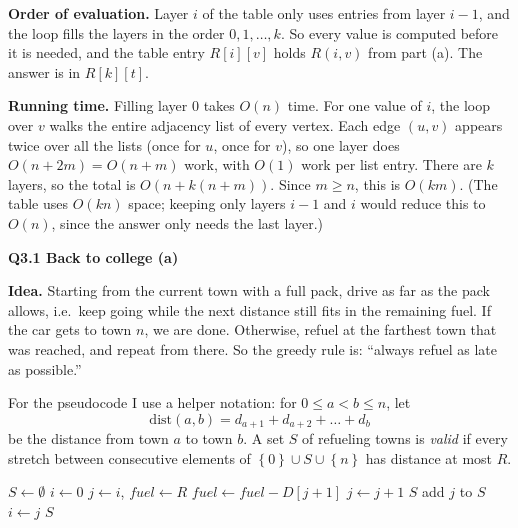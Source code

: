 \documentclass[11pt]{article}
\newcommand{\set}[1]{\left\{#1\right\}}
\newcommand{\qpage}[1]{\clearpage\noindent\textbf{\large #1}\par\medskip}
\begin{document}
\textbf{Order of evaluation.}
Layer $i$ of the table only uses entries from layer $i-1$, and the loop fills the layers in the order $0,1,\dots,k$.
So every value is computed before it is needed, and the table entry $R[i][v]$ holds $R(i,v)$ from part (a).
The answer is in $R[k][t]$.

\textbf{Running time.}
Filling layer $0$ takes $O(n)$ time.
For one value of $i$, the loop over $v$ walks the entire adjacency list of every vertex.
Each edge $(u,v)$ appears twice over all the lists (once for $u$, once for $v$), so one layer does $O(n + 2m) = O(n+m)$ work, with $O(1)$ work per list entry.
There are $k$ layers, so the total is $O(n + k(n+m))$.
Since $m \ge n$, this is $O(km)$.
(The table uses $O(kn)$ space; keeping only layers $i-1$ and $i$ would reduce this to $O(n)$, since the answer only needs the last layer.)
    

\qpage{Q3.1 Back to college (a)}

\textbf{Idea.}
Starting from the current town with a full pack, drive as far as the pack allows, i.e.\ keep going while the next distance still fits in the remaining fuel.
If the car gets to town $n$, we are done.
Otherwise, refuel at the farthest town that was reached, and repeat from there.
So the greedy rule is: ``always refuel as late as possible.''

For the pseudocode I use a helper notation: for $0 \le a < b \le n$, let
\[
  \mathrm{dist}(a,b) = d_{a+1} + d_{a+2} + \dots + d_b
\]
be the distance from town $a$ to town $b$.
A set $S$ of refueling towns is \emph{valid} if every stretch between consecutive elements of $\set{0} \cup S \cup \set{n}$ has distance at most $R$.

\begin{algorithmic}[1]
    \State $S \gets \emptyset$
    \State $i \gets 0$ 
      \State $j \gets i$, $\mathit{fuel} \gets R$
       
        \State $\mathit{fuel} \gets \mathit{fuel} - D[j+1]$
        \State $j \gets j+1$
      \EndWhile
        \State \Return $S$ 
      \EndIf
      \State add $j$ to $S$ 
      \State $i \gets j$
    \EndWhile
    \State \Return $S$ 
  \EndFunction
\end{algorithmic}
\end{document}
